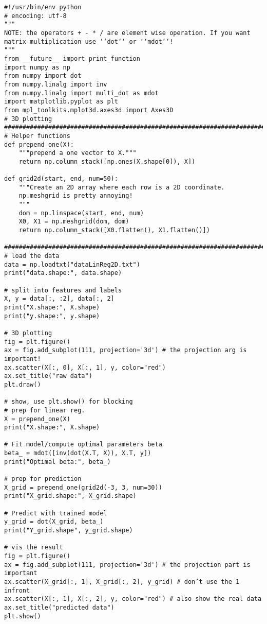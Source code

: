\begin{code}
\begin{verbatim}
#!/usr/bin/env python
# encoding: utf-8
"""
NOTE: the operators + - * / are element wise operation. If you want
matrix multiplication use ‘‘dot‘‘ or ‘‘mdot‘‘!
"""
from __future__ import print_function
import numpy as np
from numpy import dot
from numpy.linalg import inv
from numpy.linalg import multi_dot as mdot
import matplotlib.pyplot as plt
from mpl_toolkits.mplot3d.axes3d import Axes3D
# 3D plotting
###############################################################################
# Helper functions
def prepend_one(X):
    """prepend a one vector to X."""
    return np.column_stack([np.ones(X.shape[0]), X])

def grid2d(start, end, num=50):
    """Create an 2D array where each row is a 2D coordinate.
    np.meshgrid is pretty annoying!
    """
    dom = np.linspace(start, end, num)
    X0, X1 = np.meshgrid(dom, dom)
    return np.column_stack([X0.flatten(), X1.flatten()])

###############################################################################
# load the data
data = np.loadtxt("dataLinReg2D.txt")
print("data.shape:", data.shape)

# split into features and labels
X, y = data[:, :2], data[:, 2]
print("X.shape:", X.shape)
print("y.shape:", y.shape)

# 3D plotting
fig = plt.figure()
ax = fig.add_subplot(111, projection='3d') # the projection arg is important!
ax.scatter(X[:, 0], X[:, 1], y, color="red")
ax.set_title("raw data")
plt.draw()

# show, use plt.show() for blocking
# prep for linear reg.
X = prepend_one(X)
print("X.shape:", X.shape)

# Fit model/compute optimal parameters beta
beta_ = mdot([inv(dot(X.T, X)), X.T, y])
print("Optimal beta:", beta_)

# prep for prediction
X_grid = prepend_one(grid2d(-3, 3, num=30))
print("X_grid.shape:", X_grid.shape)

# Predict with trained model
y_grid = dot(X_grid, beta_)
print("Y_grid.shape", y_grid.shape)

# vis the result
fig = plt.figure()
ax = fig.add_subplot(111, projection='3d') # the projection part is important
ax.scatter(X_grid[:, 1], X_grid[:, 2], y_grid) # don’t use the 1 infront
ax.scatter(X[:, 1], X[:, 2], y, color="red") # also show the real data
ax.set_title("predicted data")
plt.show()
\end{verbatim}
\end{code}

